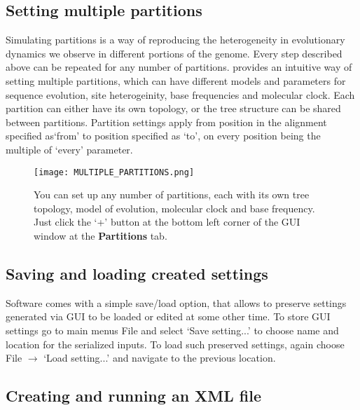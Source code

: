\subsection{Setting multiple partitions}

Simulating partitions is a way of reproducing the heterogeneity in evolutionary dynamics we observe in different portions of the genome. Every step described above can be repeated for any number of partitions. 
{\bussname} provides an intuitive way of setting multiple partitions, which can have different models and parameters for sequence evolution, site heterogeinity, base frequencies and molecular clock.
Each partition can either have its own topology, or the tree structure can be shared between partitions.
Partition settings apply from position in the alignment specified as`from' to position specified as `to', on every position being the multiple of `every' parameter.

\begin{figure}[H]
\centering
\texttt{[image: MULTIPLE\_PARTITIONS.png]} 
\caption{You can set up any number of partitions, each with its own tree topology, model of evolution, molecular clock and base frequency. Just click the `+' button at the bottom left corner of the GUI window at the \textbf{Partitions} tab.}
\label{fig:partitions}
\end{figure}

\subsection{Saving and loading created settings}
Software comes with a simple save/load option, that allows to preserve settings generated via GUI to be loaded or edited at some other time. To store GUI settings go to main menus File and select `Save setting...' to choose name and location for the serialized inputs. 
To load such preserved settings, again choose File $\longrightarrow$ `Load setting...' and navigate to the previous location.

\subsection{Creating and running an XML file}

